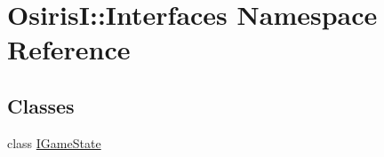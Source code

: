 \hypertarget{namespace_osiris_i_1_1_interfaces}{\section{Osiris\-I\-:\-:Interfaces Namespace Reference}
\label{namespace_osiris_i_1_1_interfaces}
}
\subsection*{Classes}
\begin{DoxyCompactItemize}
\item 
class \hyperlink{class_osiris_i_1_1_interfaces_1_1_i_game_state}{I\-Game\-State}
\end{DoxyCompactItemize}

